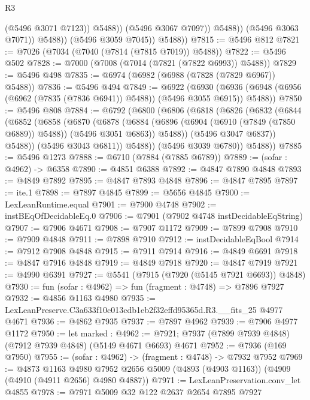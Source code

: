 \begin{lexlean}{R3}
\begin{coremodule}
                            (@5496 @3071 @7123))
                          @5488))
                      (@5496 @3067 @7097))
                    @5488))
                (@5496 @3063 @7071))
              @5488))
          (@5496 @3059 @7045))
        @5488))
@7815 := @5496 @812
@7821 := @7026 (@7034 (@7040 (@7814 (@7815 @7019)) @5488))
@7822 := @5496 @502
@7828 := @7000 (@7008 (@7014 (@7821 (@7822 @6993)) @5488))
@7829 := @5496 @498
@7835 := @6974 (@6982 (@6988 (@7828 (@7829 @6967)) @5488))
@7836 := @5496 @494
@7849 := @6922
    (@6930 (@6936 (@6948 (@6956 (@6962 (@7835 (@7836 @6941)) @5488)) (@5496 @3055 @6915)) @5488))
@7850 := @5496 @808
@7884 := @6792
    (@6800
      (@6806
        (@6818
          (@6826
            (@6832
              (@6844
                (@6852
                  (@6858
                    (@6870
                      (@6878
                        (@6884
                          (@6896 (@6904 (@6910 (@7849 (@7850 @6889)) @5488)) (@5496 @3051 @6863))
                          @5488))
                      (@5496 @3047 @6837))
                    @5488))
                (@5496 @3043 @6811))
              @5488))
          (@5496 @3039 @6780))
        @5488))
@7885 := @5496 @1273
@7888 := @6710 (@7884 (@7885 @6789))
@7889 := (sofar : @4962) -> @6358
@7890 := @4851 @6388
@7892 := @4847 @7890 @4848
@7893 := @4849 @7892
@7895 := @4847 @7893 @4848
@7896 := @4847 @7895
@7897 := ite.{1}
@7898 := @7897 @4845
@7899 := @5656 @4845
@7900 := LexLeanRuntime.equal
@7901 := @7900 @4748
@7902 := instBEqOfDecidableEq.{0}
@7906 := @7901 (@7902 @4748 instDecidableEqString)
@7907 := @7906 @4671
@7908 := @7907 @1172
@7909 := @7899 @7908
@7910 := @7909 @4848
@7911 := @7898 @7910
@7912 := instDecidableEqBool
@7914 := @7912 @7908 @4848
@7915 := @7911 @7914
@7916 := @4849 @6691
@7918 := @4847 @7916 @4848
@7919 := @4849 @7918
@7920 := @4847 @7919
@7921 := @4990 @6391
@7927 := @5541 (@7915 (@7920 (@5145 @7921 @6693)) @4848)
@7930 := fun (sofar : @4962) => fun (fragment : @4748) => @7896 @7927
@7932 := @4856 @1163 @4980
@7935 := LexLeanPreserve.C3a633f10c013cdb1eb2f32effd95365d.R3.__fits_25 @4977 @4671
@7936 := @4862 @7935
@7937 := @7897 @4962
@7939 := @7906 @4977 @1172
@7950 := let marked : @4962 := @7921;
  @7937 (@7899 @7939 @4848) (@7912 @7939 @4848) (@5149 @4671 @6693) @4671
@7952 := @7936 (@169 @7950)
@7955 := (sofar : @4962) -> (fragment : @4748) -> @7932 @7952
@7969 := @4873
    @1163
    @4980
    @7952
    @2656
    @5009
    (@4893 (@4903 @1163))
    (@4909 (@4910 (@4911 @2656) @4980 @4887))
@7971 := LexLeanPreservation.conv_let @4855
@7978 := @7971 @5009 @32 @122 @2637 @2654 @7895 @7927

\end{coremodule}
\end{lexlean}
